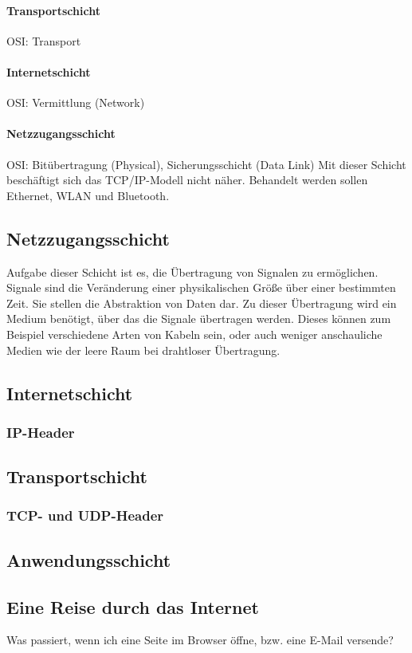 \paragraph{Transportschicht}
OSI: Transport
\paragraph{Internetschicht}
OSI: Vermittlung (Network)
\paragraph{Netzzugangsschicht}
OSI: Bitübertragung (Physical), Sicherungsschicht (Data Link)
Mit dieser Schicht beschäftigt sich das TCP/IP-Modell nicht näher.
Behandelt werden sollen Ethernet, WLAN und Bluetooth.

\subsection{Netzzugangsschicht}
Aufgabe dieser Schicht ist es, die Übertragung von Signalen zu ermöglichen.
Signale sind die Veränderung einer physikalischen Größe über einer bestimmten Zeit.
Sie stellen die Abstraktion von Daten dar.
Zu dieser Übertragung wird ein Medium benötigt, über das die Signale übertragen werden.
Dieses können zum Beispiel verschiedene Arten von Kabeln sein,
oder auch weniger anschauliche Medien wie der leere Raum bei drahtloser Übertragung.


\subsection{Internetschicht}

\subsubsection{IP-Header}


\subsection{Transportschicht}

\subsubsection{TCP- und UDP-Header}


\subsection{Anwendungsschicht}

\subsection{Eine Reise durch das Internet}

Was passiert, wenn ich eine Seite im Browser öffne, bzw. eine E-Mail versende?
